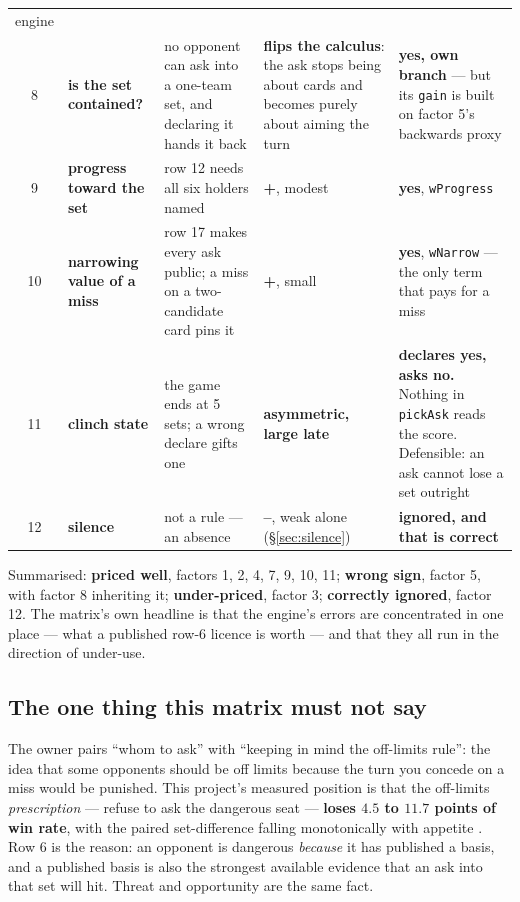 \documentclass[11pt]{article}
\newcommand{\code}[1]{\texttt{#1}}
\begin{document}
\begin{table}[p]
\begin{tabular}{@{}c p{} p{} p{} p{}@{}}
  engine \cite{crossplay} \\
8 & \textbf{is the set contained?} & no opponent can ask into a one-team set, and declaring
  it hands it back & \textbf{flips the calculus}: the ask stops being about cards and
  becomes purely about aiming the turn & \textbf{yes, own branch} --- but its
  \code{gain} is built on factor 5's backwards proxy \\
9 & \textbf{progress toward the set} & row 12 needs all six holders named
  & \textbf{+}, modest & \textbf{yes}, \code{wProgress} \\
10 & \textbf{narrowing value of a miss} & row 17 makes every ask public; a miss on a
  two-candidate card pins it & \textbf{+}, small & \textbf{yes}, \code{wNarrow} --- the
  only term that pays for a miss \\
11 & \textbf{clinch state} & the game ends at 5 sets; a wrong declare gifts one
  & \textbf{asymmetric, large late} & \textbf{declares yes, asks no.} Nothing in
  \code{pickAsk} reads the score. Defensible: an ask cannot lose a set outright \\
12 & \textbf{silence} & not a rule --- an absence & \textbf{--}, weak alone
  (\S\ref{sec:silence}) & \textbf{ignored, and that is correct} \\
\bottomrule
\end{tabular}
\end{table}

Summarised: \textbf{priced well}, factors 1, 2, 4, 7, 9, 10, 11; \textbf{wrong sign},
factor 5, with factor 8 inheriting it; \textbf{under-priced}, factor 3; \textbf{correctly
ignored}, factor 12. The matrix's own headline is that the engine's errors are
concentrated in one place --- what a published row-6 licence is worth --- and that they
all run in the direction of under-use.

\subsection{The one thing this matrix must not say}
\label{sec:offlimits}

The owner pairs ``whom to ask'' with ``keeping in mind the off-limits rule'': the idea
that some opponents should be off limits because the turn you concede on a miss would be
punished. This project's measured position is that the off-limits \emph{prescription} ---
refuse to ask the dangerous seat --- \textbf{loses $4.5$ to $11.7$ points of win rate},
with the paired set-difference falling monotonically with appetite \cite{concession}. Row
6 is the reason: an opponent is dangerous \emph{because} it has published a basis, and a
published basis is also the strongest available evidence that an ask into that set will
hit. Threat and opportunity are the same fact.
\end{document}
